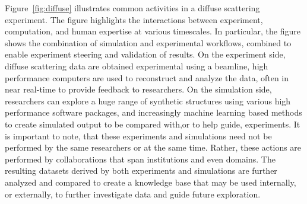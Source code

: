 \documentclass{aip-cp}
\newcommand\ian[1]{}
\newcommand\kyle[1]{}
\newcommand\ian[1]{{\color{red}[Ian: #1]}}
\newcommand\kyle[1]{{\color{purple}[Kyle: #1]}}
\begin{document}

 
\ian{Next text and Figure~\ref{fig:diffuse} are from~\cite{foster2015networking}. Need to be rewritten.}
\kyle{re-written}

Figure~\ref{fig:diffuse} illustrates common activities in a diffuse scattering experiment. 
The figure highlights the interactions between experiment, computation, and human expertise
at various timescales. In particular, the figure shows the combination of simulation and 
experimental workflows, combined to enable experiment steering and validation of results.
On the experiment side, diffuse scattering data are obtained experimental using a beamline, 
high performance computers are used to reconstruct and analyze the data, often in
near real-time to provide feedback to researchers. 
On the simulation side, researchers can explore a huge range of synthetic structures
using various high performance software packages, and increasingly machine learning
based methods to create simulated output to be compared with,or to help guide, experiments. 
It is important to note, that these experiments and simulations need not be performed
by the same researchers or at the same time. Rather, these actions are performed by
collaborations that span institutions and even domains. 
The resulting datasets derived by both experiments and simulations are further analyzed
and compared to create a knowledge base that may be used internally, or externally, 
to further investigate data and guide future exploration.
 

\end{document}
